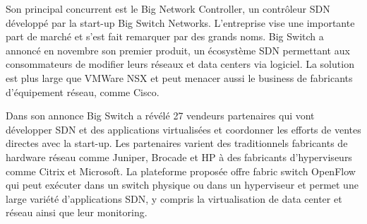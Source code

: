 Son principal concurrent est le Big Network Controller, un contrôleur SDN développé par la start-up Big Switch Networks. L'entreprise vise une importante part de marché et s'est fait remarquer par des grands noms. Big Switch a annoncé en novembre son premier produit, un écosystème SDN permettant aux consommateurs de modifier leurs réseaux et data centers via logiciel. La solution est plus large que VMWare NSX et peut menacer aussi le business de fabricants d'équipement réseau, comme Cisco. \cite{BigSwitchLaunchesFirst}


Dans son annonce Big Switch a révélé 27 vendeurs partenaires qui vont développer SDN et des applications virtualisées et coordonner les efforts de ventes directes avec la start-up. Les partenaires varient des traditionnels fabricants de hardware réseau comme Juniper, Brocade et HP à des fabricants d'hyperviseurs comme Citrix et Microsoft. La plateforme proposée offre \gls{fabric} switch OpenFlow qui peut exécuter dans un switch physique ou dans un hyperviseur et permet une large variété d'applications SDN, y compris la virtualisation de data center et réseau ainsi que leur monitoring. \cite{BigSwitchAnnouncement}




